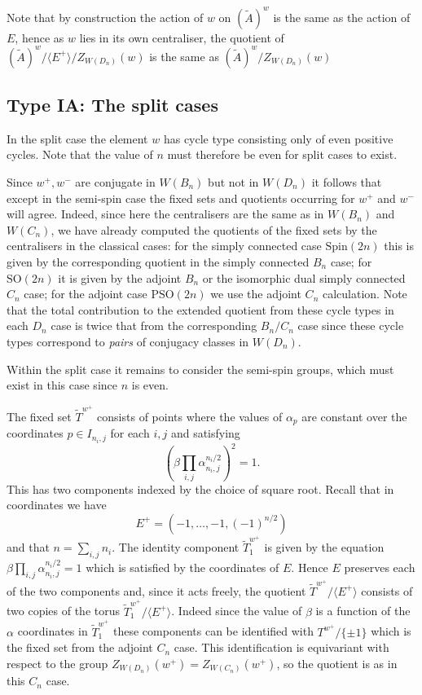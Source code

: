\documentclass[11pt,a4paper]{article}
\def\Spin{\mathrm{Spin}}
\def\SO{\mathrm{SO}}
\def\PSO{\mathrm{PSO}}
\def\Atilde{(\widetilde{A})}
\def\coveringtorus{\tilde{T}}
\def\wplus{w^+}
\def\wminus{w^-}
\begin{document}
Note that by construction the action of $w$ on $\Atilde^w$ is the same as the action of $E$, hence as $w$ lies in its own centraliser, the quotient of $\Atilde^w/\langle E^+\rangle /Z_{W(D_n)}(w)$ is the same as $\Atilde^w/Z_{W(D_n)}(w)$




\subsection{Type IA: The split cases}\label{section: split} In the split case the element $w$ has cycle type consisting only of even positive cycles. Note that the value of $n$ must therefore be even for split cases to exist.


Since $\wplus,\wminus$ are conjugate in $W(B_n)$ but not in $W(D_n)$ it follows that except in the semi-spin case the fixed sets and quotients occurring for $\wplus$ and $\wminus$ will agree.  Indeed, since here the centralisers are the same as in $W(B_n)$ and $W(C_n)$, we have already computed the quotients of the fixed sets by the centralisers in the classical cases: for the simply connected case $\Spin(2n)$ this is given by the corresponding quotient in the simply connected $B_n$ case; for $\SO(2n)$ it is given by the adjoint $B_n$ or the isomorphic dual simply connected $C_n$ case; for the adjoint case $\PSO(2n)$ we use the adjoint $C_n$ calculation.  Note that the total contribution to the extended quotient from these cycle types in each $D_n$ case is twice that from the corresponding $B_n/C_n$ case since these cycle types correspond to \emph{pairs} of conjugacy classes in $W(D_n)$.

\bigskip

Within the split case it remains to consider the semi-spin groups, which must exist in this case since $n$ is even.


The fixed set $\coveringtorus^{\wplus}$ consists of points where the values of $\alpha_p$ are constant over the coordinates $p\in I_{n_i,j}$ for each $i,j$ and satisfying
\[
\left(\beta\prod_{i,j} \alpha_{n_i,j}^{n_i/2}\right)^2=1.
\]
This has two components indexed by the choice of square root. Recall that in coordinates we have
\[
E^+=(-1,\dots,-1,(-1)^{n/2})
\]
and that $n=\sum_{i,j} n_i$. The identity component $\coveringtorus^{\wplus}_1$ is given by the equation $\beta\prod_{i,j} \alpha_{n_i,j}^{n_i/2}=1$ which is satisfied by the coordinates of $E$. Hence $E$ preserves each of the two components and, since it acts freely, the quotient $\coveringtorus^{\wplus}/\langle E^+\rangle$ consists of two copies of the torus $\coveringtorus^{\wplus}_1/\langle E^+\rangle$.  Indeed since the value of $\beta$ is a function of the $\alpha$ coordinates in $\coveringtorus^{\wplus}_1$ these components can be identified with $T^{\wplus}/\{\pm1\}$ which is the fixed set from the adjoint $C_n$ case.  This identification is equivariant with respect to the group $Z_{W(D_n)}(\wplus)=Z_{W(C_n)}(\wplus)$, so the quotient is as in this $C_n$ case.
\end{document}
